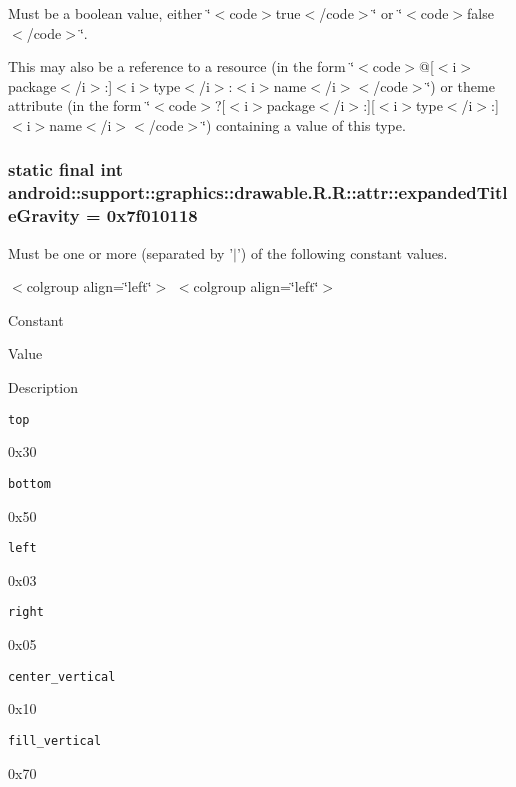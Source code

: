 Must be a boolean value, either \char`\"{}$<$code$>$true$<$/code$>$\char`\"{} or \char`\"{}$<$code$>$false$<$/code$>$\char`\"{}. 

This may also be a reference to a resource (in the form \char`\"{}$<$code$>$@\mbox{[}$<$i$>$package$<$/i$>$:\mbox{]}$<$i$>$type$<$/i$>$:$<$i$>$name$<$/i$>$$<$/code$>$\char`\"{}) or theme attribute (in the form \char`\"{}$<$code$>$?\mbox{[}$<$i$>$package$<$/i$>$:\mbox{]}\mbox{[}$<$i$>$type$<$/i$>$:\mbox{]}$<$i$>$name$<$/i$>$$<$/code$>$\char`\"{}) containing a value of this type. \hypertarget{classandroid_1_1support_1_1graphics_1_1drawable_1_1_r_1_1attr_39e6f01ff2b762cd0f40b80ca11648f5}{
\subsubsection[{expandedTitleGravity}]{\setlength{\rightskip}{0pt plus 5cm}static final int android::support::graphics::drawable.R.R::attr::expandedTitleGravity = 0x7f010118}}
\label{classandroid_1_1support_1_1graphics_1_1drawable_1_1_r_1_1attr_39e6f01ff2b762cd0f40b80ca11648f5}


Must be one or more (separated by '$|$') of the following constant values. \begin{TabularC}{0}
\hline
\end{TabularC}
$<$colgroup align=\char`\"{}left\char`\"{}$>$ $<$colgroup align=\char`\"{}left\char`\"{}$>$ 

Constant

Value

Description 

{\tt top}

0x30

{\tt bottom}

0x50

{\tt left}

0x03

{\tt right}

0x05

{\tt center\_\-vertical}

0x10

{\tt fill\_\-vertical}

0x70

